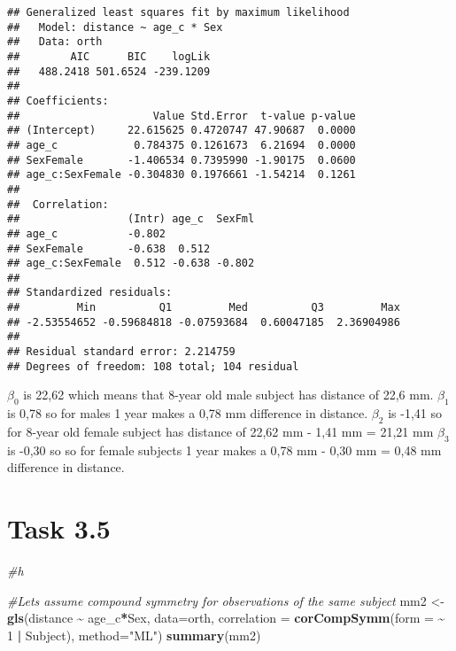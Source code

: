 \documentclass[
]{article}
\newenvironment{Shaded}{\begin{snugshade}}{\end{snugshade}}
\newcommand{\AttributeTok}[1]{\textcolor[rgb]{0.13,0.29,0.53}{#1}}
\newcommand{\CommentTok}[1]{\textcolor[rgb]{0.56,0.35,0.01}{\textit{#1}}}
\newcommand{\DecValTok}[1]{\textcolor[rgb]{0.00,0.00,0.81}{#1}}
\newcommand{\FunctionTok}[1]{\textcolor[rgb]{0.13,0.29,0.53}{\textbf{#1}}}
\newcommand{\NormalTok}[1]{#1}
\newcommand{\OtherTok}[1]{\textcolor[rgb]{0.56,0.35,0.01}{#1}}
\newcommand{\SpecialCharTok}[1]{\textcolor[rgb]{0.81,0.36,0.00}{\textbf{#1}}}
\newcommand{\StringTok}[1]{\textcolor[rgb]{0.31,0.60,0.02}{#1}}
\begin{document}
\begin{verbatim}
## Generalized least squares fit by maximum likelihood
##   Model: distance ~ age_c * Sex 
##   Data: orth 
##        AIC      BIC    logLik
##   488.2418 501.6524 -239.1209
## 
## Coefficients:
##                     Value Std.Error  t-value p-value
## (Intercept)     22.615625 0.4720747 47.90687  0.0000
## age_c            0.784375 0.1261673  6.21694  0.0000
## SexFemale       -1.406534 0.7395990 -1.90175  0.0600
## age_c:SexFemale -0.304830 0.1976661 -1.54214  0.1261
## 
##  Correlation: 
##                 (Intr) age_c  SexFml
## age_c           -0.802              
## SexFemale       -0.638  0.512       
## age_c:SexFemale  0.512 -0.638 -0.802
## 
## Standardized residuals:
##         Min          Q1         Med          Q3         Max 
## -2.53554652 -0.59684818 -0.07593684  0.60047185  2.36904986 
## 
## Residual standard error: 2.214759 
## Degrees of freedom: 108 total; 104 residual
\end{verbatim}

\(\beta_0\) is 22,62 which means that 8-year old male subject has
distance of 22,6 mm. \(\beta_1\) is 0,78 so for males 1 year makes a
0,78 mm difference in distance. \(\beta_2\) is -1,41 so for 8-year old
female subject has distance of 22,62 mm - 1,41 mm = 21,21 mm \(\beta_3\)
is -0,30 so so for female subjects 1 year makes a 0,78 mm - 0,30 mm =
0,48 mm difference in distance.

\hypertarget{task-3.5}{%
\section{Task 3.5}\label{task-3.5}}

\begin{Shaded}
\begin{Highlighting}[]
\CommentTok{\#h}

\CommentTok{\#Let\textquotesingle{}s assume compound symmetry for observations of the same subject}
\NormalTok{mm2 }\OtherTok{\textless{}{-}} \FunctionTok{gls}\NormalTok{(distance }\SpecialCharTok{\textasciitilde{}}\NormalTok{ age\_c}\SpecialCharTok{*}\NormalTok{Sex, }\AttributeTok{data=}\NormalTok{orth,}
           \AttributeTok{correlation =} \FunctionTok{corCompSymm}\NormalTok{(}\AttributeTok{form =} \SpecialCharTok{\textasciitilde{}} \DecValTok{1} \SpecialCharTok{|}\NormalTok{ Subject),}
           \AttributeTok{method=}\StringTok{"ML"}\NormalTok{)}
\FunctionTok{summary}\NormalTok{(mm2)}
\end{Highlighting}
\end{Shaded}
\end{document}
